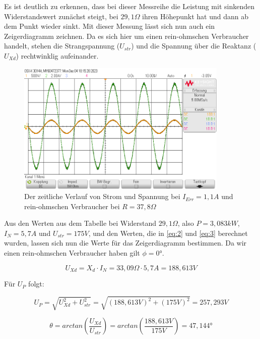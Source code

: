 \documentclass{report}
\begin{document}
Es ist deutlich zu erkennen, dass bei dieser Messreihe die Leistung mit sinkenden Widerstandswert zunächst steigt, bei $29,1\Omega$ ihren Höhepunkt hat und dann ab dem Punkt wieder sinkt. Mit dieser Messung lässt sich nun auch ein Zeigerdiagramm zeichnen. Da es sich hier um einen rein-ohmschen Verbraucher handelt, stehen die Strangspannung ($U_{str}$) und die Spannung über die Reaktanz ($U_{Xd}$) rechtwinklig aufeinander.

\begin{figure}[!ht]
	\centering
	\includegraphics[width=0.9\textwidth]{./assets/img/Inselbetrieb378IE11.png}
	\caption{Der zeitliche Verlauf von Strom und Spannung bei $I_{Err} = 1,1A$ und rein-ohmschen Verbraucher bei $R=37,8\Omega$}
	\label{fig:inselbetrieb_ohm_oszi}
\end{figure}

Aus den Werten aus dem Tabelle bei Widerstand $29,1\Omega$, also $P=3,083kW$, $I_{N} = 5,7A$ und $U_{str} = 175V$, und den Werten, die in \ref{eq:2} und \ref{eq:3} berechnet wurden, lassen sich nun die Werte für das Zeigerdiagramm bestimmen. Da wir einen rein-ohmschen Verbraucher haben gilt $\phi = 0°$.

\begin{equation}
	\label{eq:4}
	U_{Xd} = X_{d} \cdot I_{N} = 33,09\Omega \cdot 5,7A = 188,613V
\end{equation}

Für $U_{P}$ folgt:

\begin{equation}
	\label{eq:5}
	U_{P} = \sqrt{U_{Xd}^{2} + U_{str}^{2}} = \sqrt{(188,613V)^{2} + (175V)^{2}} = 257,293V
\end{equation}

\begin{equation}
	\label{eq:6}
	\theta = arctan(\frac{U_{Xd}}{U_{str}}) = arctan(\frac{188,613V}{175V}) = 47,144°
\end{equation}
\end{document}
